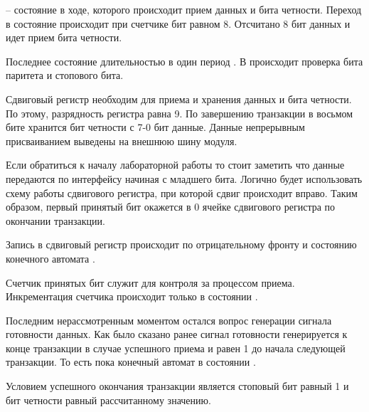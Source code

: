\par{ – состояние в ходе, которого происходит прием данных и бита четности. Переход в состояние  происходит при счетчике бит равном 8. Отсчитано 8 бит данных и идет прием бита четности.}

\par{Последнее состояние  длительностью в один период . В  происходит проверка бита паритета и стопового бита.}



\par{Сдвиговый регистр необходим для приема и хранения данных и бита четности. По этому, разрядность регистра равна 9. По завершению транзакции в восьмом бите хранится бит четности с 7-0 бит данные. Данные непрерывным присваиванием выведены на внешнюю шину модуля.}

\par{Если обратиться к началу лабораторной работы то стоит заметить что данные передаются по интерфейсу  начиная с младшего бита. Логично будет использовать схему работы сдвигового регистра, при которой сдвиг происходит вправо. Таким образом, первый принятый бит окажется в 0 ячейке сдвигового регистра по окончании транзакции.}

\par{Запись в сдвиговый регистр происходит по отрицательному фронту  и состоянию конечного автомата .}



\par{Счетчик принятых бит служит для контроля за процессом приема. Инкрементация счетчика происходит только в состоянии .}



\par{Последним нерассмотренным моментом остался вопрос генерации сигнала готовности данных. Как было сказано ранее сигнал готовности генерируется к конце транзакции в случае успешного приема и равен 1 до начала следующей транзакции. То есть пока конечный автомат в состоянии .}

\par{Условием успешного окончания транзакции является стоповый бит равный 1 и бит четности равный рассчитанному значению.}

